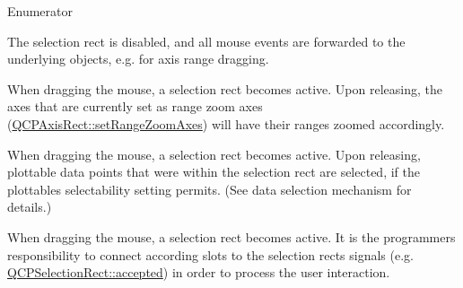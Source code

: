 \begin{Desc}
\item[Enumerator]\par
\begin{description}
\item[{\em 
srm\+None\hypertarget{namespaceQCP_ac9aa4d6d81ac76b094f9af9ad2d3aacfa9032f170490d67240a6c68c2638ffab1}{}\label{namespaceQCP_ac9aa4d6d81ac76b094f9af9ad2d3aacfa9032f170490d67240a6c68c2638ffab1}
}]The selection rect is disabled, and all mouse events are forwarded to the underlying objects, e.\+g. for axis range dragging. \item[{\em 
srm\+Zoom\hypertarget{namespaceQCP_ac9aa4d6d81ac76b094f9af9ad2d3aacfa739c260bf4d9a15f73423c91158b9428}{}\label{namespaceQCP_ac9aa4d6d81ac76b094f9af9ad2d3aacfa739c260bf4d9a15f73423c91158b9428}
}]When dragging the mouse, a selection rect becomes active. Upon releasing, the axes that are currently set as range zoom axes (\hyperlink{classQCPAxisRect_a9442cca2aa358405f39a64d51eca13d2}{Q\+C\+P\+Axis\+Rect\+::set\+Range\+Zoom\+Axes}) will have their ranges zoomed accordingly. \item[{\em 
srm\+Select\hypertarget{namespaceQCP_ac9aa4d6d81ac76b094f9af9ad2d3aacfa62c286e8da283a0cbb88ecac2f3f7506}{}\label{namespaceQCP_ac9aa4d6d81ac76b094f9af9ad2d3aacfa62c286e8da283a0cbb88ecac2f3f7506}
}]When dragging the mouse, a selection rect becomes active. Upon releasing, plottable data points that were within the selection rect are selected, if the plottable\textquotesingle{}s selectability setting permits. (See data selection mechanism for details.) \item[{\em 
srm\+Custom\hypertarget{namespaceQCP_ac9aa4d6d81ac76b094f9af9ad2d3aacfa15e7a00c8e7e0673c7b31d75266888d4}{}\label{namespaceQCP_ac9aa4d6d81ac76b094f9af9ad2d3aacfa15e7a00c8e7e0673c7b31d75266888d4}
}]When dragging the mouse, a selection rect becomes active. It is the programmer\textquotesingle{}s responsibility to connect according slots to the selection rect\textquotesingle{}s signals (e.\+g. \hyperlink{classQCPSelectionRect_a15a43542e1f7b953a44c260b419e6d2c}{Q\+C\+P\+Selection\+Rect\+::accepted}) in order to process the user interaction. \end{description}
\end{Desc}
